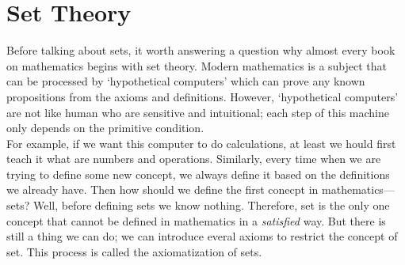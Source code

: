 \documentclass[a4paper]{book}
\theoremstyle{break}
\begin{document}
	\chapter{Set Theory}
		Before talking about sets, it worth answering a question why almost every book on mathematics begins with set theory. Modern mathematics is a subject that can be processed by `hypothetical computers' which can prove any known propositions from the axioms and definitions. However, `hypothetical computers' are not like human who are sensitive and intuitional; each step of this machine only depends on the primitive condition.\\
		For example, if we want this computer to do calculations, at least we hould first teach it what are numbers and operations. Similarly, every time when we are trying to define some new concept, we always define it based on the definitions we already have. Then how should we define the first conecpt in mathematics---sets? Well, before defining sets we know nothing. Therefore, set is the only one concept that cannot be defined in mathematics in a \textit{satisfied} way. But there is still a thing we can do; we can introduce everal axioms to restrict the concept of set. This process is called the axiomatization of sets.
\end{document}
